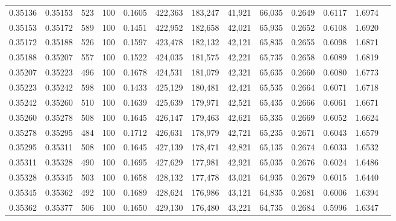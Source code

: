 \begin{tabular}{rrrrrrrrrrrrr}
0.35136 & 0.35153 &   523 & 100 &                                     0.1605 & 422,363 & 183,247 &  41,921 &  66,035 & 0.2649 & 0.6117 & 1.6974 \\
0.35153 & 0.35172 &   589 & 100 &                                     0.1451 & 422,952 & 182,658 &  42,021 &  65,935 & 0.2652 & 0.6108 & 1.6920 \\
0.35172 & 0.35188 &   526 & 100 &                                     0.1597 & 423,478 & 182,132 &  42,121 &  65,835 & 0.2655 & 0.6098 & 1.6871 \\
0.35188 & 0.35207 &   557 & 100 &                                     0.1522 & 424,035 & 181,575 &  42,221 &  65,735 & 0.2658 & 0.6089 & 1.6819 \\
0.35207 & 0.35223 &   496 & 100 &                                     0.1678 & 424,531 & 181,079 &  42,321 &  65,635 & 0.2660 & 0.6080 & 1.6773 \\
0.35223 & 0.35242 &   598 & 100 &                                     0.1433 & 425,129 & 180,481 &  42,421 &  65,535 & 0.2664 & 0.6071 & 1.6718 \\
0.35242 & 0.35260 &   510 & 100 &                                     0.1639 & 425,639 & 179,971 &  42,521 &  65,435 & 0.2666 & 0.6061 & 1.6671 \\
0.35260 & 0.35278 &   508 & 100 &                                     0.1645 & 426,147 & 179,463 &  42,621 &  65,335 & 0.2669 & 0.6052 & 1.6624 \\
0.35278 & 0.35295 &   484 & 100 &                                     0.1712 & 426,631 & 178,979 &  42,721 &  65,235 & 0.2671 & 0.6043 & 1.6579 \\
0.35295 & 0.35311 &   508 & 100 &                                     0.1645 & 427,139 & 178,471 &  42,821 &  65,135 & 0.2674 & 0.6033 & 1.6532 \\
0.35311 & 0.35328 &   490 & 100 &                                     0.1695 & 427,629 & 177,981 &  42,921 &  65,035 & 0.2676 & 0.6024 & 1.6486 \\
0.35328 & 0.35345 &   503 & 100 &                                     0.1658 & 428,132 & 177,478 &  43,021 &  64,935 & 0.2679 & 0.6015 & 1.6440 \\
0.35345 & 0.35362 &   492 & 100 &                                     0.1689 & 428,624 & 176,986 &  43,121 &  64,835 & 0.2681 & 0.6006 & 1.6394 \\
0.35362 & 0.35377 &   506 & 100 &                                     0.1650 & 429,130 & 176,480 &  43,221 &  64,735 & 0.2684 & 0.5996 & 1.6347 \\

\end{tabular}
